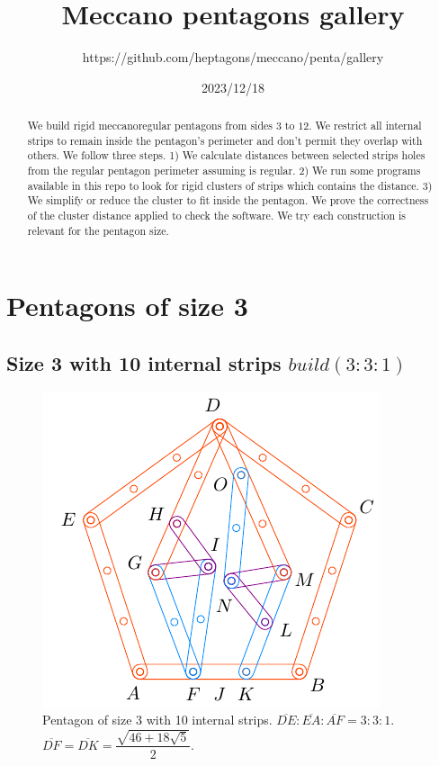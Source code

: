 \documentclass[11pt]{article}
\title{Meccano pentagons gallery}
\author{https://github.com/heptagons/meccano/penta/gallery}
\date{2023/12/18}
\begin{document}
\maketitle
\begin{abstract}
We build rigid meccano\meccanoref regular pentagons from sides $3$ to $12$. We restrict all internal strips to remain inside the pentagon's perimeter and don't permit they overlap with others. We follow three steps. 1) We calculate distances between selected strips holes from the regular pentagon perimeter assuming is regular. 2) We run some programs available in this repo to look for rigid clusters of strips which contains the distance. 3) We simplify or reduce the cluster to fit inside the pentagon. We prove the correctness of the cluster distance applied to check the software. We try each construction is relevant for the pentagon size.
\end{abstract}


\section{Pentagons of size 3}

\subsection{Size 3 with 10 internal strips $build(3:3:1)$}

\begin{figure}[H]
\centering
\includegraphics[scale=1.2]{3/penta3-10a}
\caption{Pentagon of size 3 with 10 internal strips. $\overline{DE}:\overline{EA}:\overline{AF} = 3:3:1$. $\overline{DF} = \overline{DK} = \dfrac{\sqrt{46+18\sqrt5}}2$.}
\label{fig:penta3-10a}
\end{figure}
\end{document}
